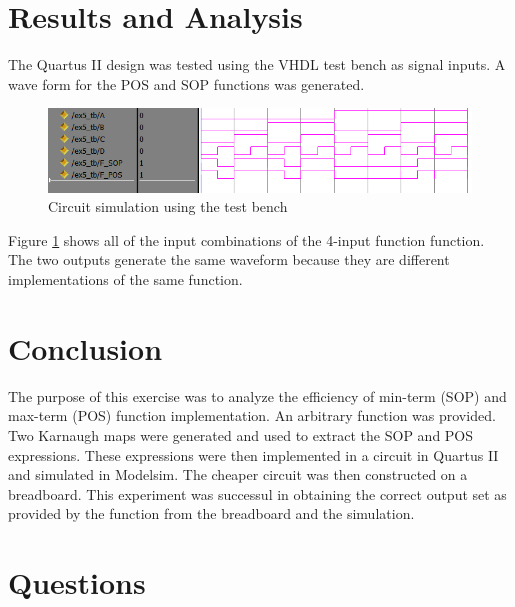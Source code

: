 \documentclass[CMPE]{KGCOEReport}
\begin{document}
\section*{Results and Analysis}

The Quartus II design was tested using the VHDL test bench as signal inputs. A wave form for the POS and SOP functions was generated.

\begin{figure}[htbp]
	\centering
	\includegraphics[width=\textwidth]{lab5_procedure}
	\caption{Circuit simulation using the test bench}
	\label{fig:simulation}
\end{figure}

Figure \ref{fig:simulation} shows all of the input combinations of the 4-input function function. The two outputs generate the same waveform because they are different implementations of the same function.

\section*{Conclusion}

The purpose of this exercise was to analyze the efficiency of min-term (SOP) and max-term (POS) function implementation. An arbitrary function was provided. Two Karnaugh maps were generated and used to extract the SOP and POS expressions. These expressions were then implemented in a circuit in Quartus II and simulated in Modelsim. The cheaper circuit was then constructed on a breadboard. This experiment was successul in obtaining the correct output set as provided by the function from the breadboard and the simulation.

\pagebreak

\section*{Questions}
\end{document}
